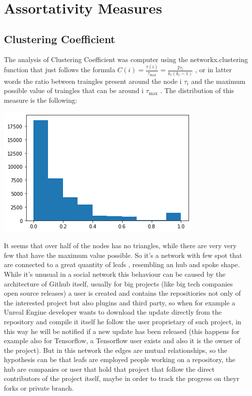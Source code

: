 \documentclass[]{article}
\begin{document}
    \section*{Assortativity Measures}
    \subsection*{Clustering Coefficient}
    The analysis of Clustering Coefficient was computer using the networkx.clustering function that just follows the formula 
    $C(i)= \frac{\tau(i)}{\tau_{\max}} = \frac{2\tau_i}{k_i(k_i-1)}$ , or in latter words the ratio between traingles present around the node i $\tau_i$ and the maximum possible value of traingles that can be around i $\tau_{\max}$ . The distribution of this measure is the following: 
    \begin{center}
        \includegraphics[scale=0.5]{charts/cc_distr.png}
    \end{center}
    It seems that over half of the nodes has no triangles, while there are very very few that have the maximum value possible. So it's a network with few spot that are connected to a great quantity of leafs , resembling an hub and spoke shape. While it's unusual in a social network this behaviour can be caused by the architecture of Github itself, usually for big projects (like big tech companies open source releases) a user is created and contains the repositiories not only of the interested project but also plugins and third party, so when for example a Unreal Engine developer wants to download the update directly from the repository and compile it itself he follow the user proprietary of such project, in this way he will be notified if a new update has been released (this happens for example also for Tensorflow, a Tensorflow user exists and also it is the owner of the project). But in this network the edges are mutual relationships, so the hypothesis can be that leafs are employed people working on a repository, the hub are companies or user that hold that project that follow the direct contributors of the project itself, maybe in order to track the progress on theyr forks or private branch.
\end{document}
